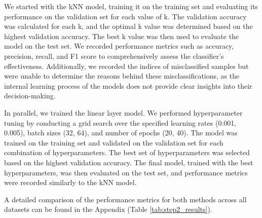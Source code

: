 \documentclass[a4paper]{article}
\begin{document}
We started with the kNN model, training it on the training set and evaluating its performance on the validation set for each value of k. The validation accuracy was calculated for each k, and the optimal k value was determined based on the highest validation accuracy. The best k value was then used to evaluate the model on the test set. We recorded performance metrics such as accuracy, precision, recall, and F1 score to comprehensively assess the classifier's effectiveness. Additionally, we recorded the indices of misclassified samples but were unable to determine the reasons behind these misclassifications, as the internal learning process of the models does not provide clear insights into their decision-making.

In parallel, we trained the linear layer model. We performed hyperparameter tuning by conducting a grid search over the specified learning rates (0.001, 0.005), batch sizes (32, 64), and number of epochs (20, 40). The model was trained on the training set and validated on the validation set for each combination of hyperparameters. The best set of hyperparameters was selected based on the highest validation accuracy. The final model, trained with the best hyperparameters, was then evaluated on the test set, and performance metrics were recorded similarly to the kNN model.

A detailed comparison of the performance metrics for both methods across all datasets can be found in the Appendix (Table \ref{tab:step2_results}).
\end{document}
